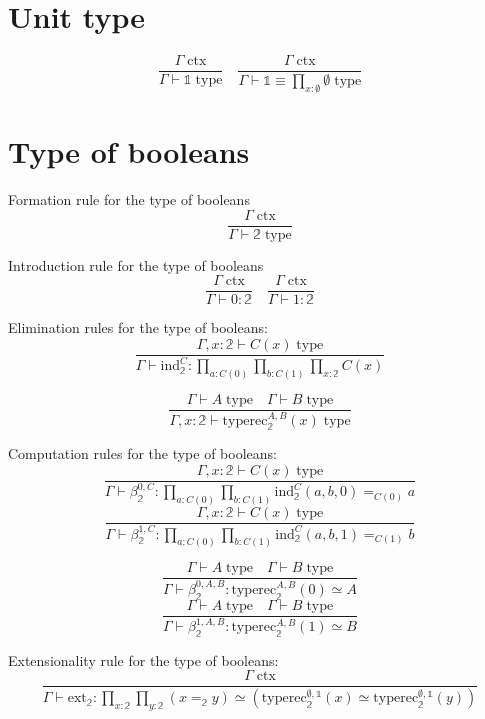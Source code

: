 \documentclass{book}
\begin{document}
\section{Unit type}

$$\frac{\Gamma \; \mathrm{ctx}}{\Gamma \vdash \mathbb{1} \; \mathrm{type}} \quad \frac{\Gamma \; \mathrm{ctx}}{\Gamma \vdash \mathbb{1} \equiv \prod_{x:\emptyset} \emptyset \; \mathrm{type}}$$

\section{Type of booleans}

Formation rule for the type of booleans
$$\frac{\Gamma \; \mathrm{ctx}}{\Gamma \vdash \mathbb{2} \; \mathrm{type}}$$

Introduction rule for the type of booleans
$$\frac{\Gamma \; \mathrm{ctx}}{\Gamma \vdash 0:\mathbb{2}} \quad \frac{\Gamma \; \mathrm{ctx}}{\Gamma \vdash 1:\mathbb{2}}$$

Elimination rules for the type of booleans:
$$\frac{\Gamma, x:\mathbb{2} \vdash C(x) \; \mathrm{type}}{\Gamma \vdash \mathrm{ind}_\mathbb{2}^C:\prod_{a:C(0)} \prod_{b:C(1)} \prod_{x:\mathbb{2}} C(x)}$$

$$\frac{\Gamma \vdash A \; \mathrm{type} \quad \Gamma \vdash B \; \mathrm{type}}{\Gamma, x:\mathbb{2} \vdash \mathrm{typerec}_\mathbb{2}^{A, B}(x) \; \mathrm{type}}$$

Computation rules for the type of booleans:
$$\frac{\Gamma, x:\mathbb{2} \vdash C(x) \; \mathrm{type}}{\Gamma \vdash \beta_\mathbb{2}^{0, C}:\prod_{a:C(0)} \prod_{b:C(1)} \mathrm{ind}_\mathbb{2}^C(a, b, 0) =_{C(0)} a}$$
$$\frac{\Gamma, x:\mathbb{2} \vdash C(x) \; \mathrm{type}}{\Gamma \vdash \beta_\mathbb{2}^{1, C}:\prod_{a:C(0)} \prod_{b:C(1)} \mathrm{ind}_\mathbb{2}^C(a, b, 1) =_{C(1)} b}$$

$$\frac{\Gamma \vdash A \; \mathrm{type} \quad \Gamma \vdash B \; \mathrm{type}}{\Gamma \vdash \beta_\mathbb{2}^{0, A, B}:\mathrm{typerec}_\mathbb{2}^{A, B}(0) \simeq A}$$
$$\frac{\Gamma \vdash A \; \mathrm{type} \quad \Gamma \vdash B \; \mathrm{type}}{\Gamma \vdash \beta_\mathbb{2}^{1, A, B}:\mathrm{typerec}_\mathbb{2}^{A, B}(1) \simeq B}$$

Extensionality rule for the type of booleans:
$$\frac{\Gamma \; \mathrm{ctx}}{\Gamma \vdash \mathrm{ext}_\mathbb{2}:\prod_{x:\mathbb{2}} \prod_{y:\mathbb{2}} (x =_{\mathbb{2}} y) \simeq (\mathrm{typerec}_\mathbb{2}^{\emptyset, \mathbb{1}}(x) \simeq \mathrm{typerec}_\mathbb{2}^{\emptyset, \mathbb{1}}(y))}$$
\end{document}
